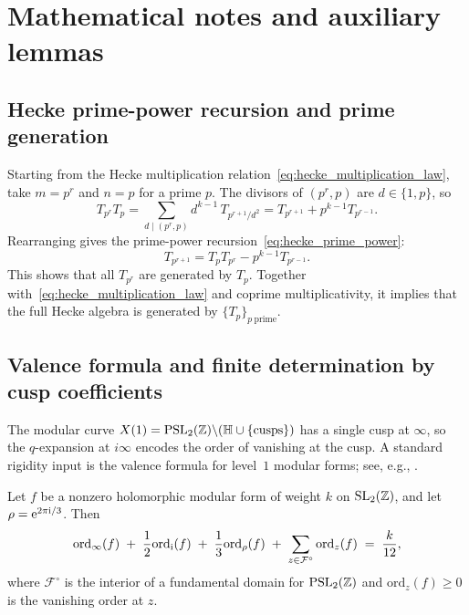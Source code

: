
\section{Mathematical notes and auxiliary lemmas}
\label{app:math_notes}

\subsection{Hecke prime-power recursion and prime generation}
\label{app:hecke_recursion}

Starting from the Hecke multiplication relation~\eqref{eq:hecke_multiplication_law}, take $m=p^r$ and $n=p$ for a prime $p$. The divisors of $(p^r,p)$ are $d\in\{1,p\}$, so
\begin{equation}
T_{p^r}T_p
=\sum_{d\mid(p^r,p)} d^{k-1}\,T_{p^{r+1}/d^2}
=T_{p^{r+1}}+p^{k-1}T_{p^{r-1}}.
\end{equation}
Rearranging gives the prime-power recursion~\eqref{eq:hecke_prime_power}:
\begin{equation}
T_{p^{r+1}}=T_pT_{p^r}-p^{k-1}T_{p^{r-1}}.
\end{equation}
This shows that all $T_{p^r}$ are generated by $T_p$. Together with~\eqref{eq:hecke_multiplication_law} and coprime multiplicativity, it implies that the full Hecke algebra is generated by $\{T_p\}_{p\ \mathrm{prime}}$.

\subsection{Valence formula and finite determination by cusp coefficients}
\label{app:valence_finite_determination}

The modular curve $X(1)=\mathrm{PSL}_2(\mathbb{Z})\backslash(\mathbb{H}\cup\{\text{cusps}\})$ has a single cusp at $\infty$, so the $q$-expansion at $i\infty$ encodes the order of vanishing at the cusp. A standard rigidity input is the valence formula for level~$1$ modular forms; see, e.g., \cite{Apostol1990,DiamondShurman2005,Serre1973}.

\begin{theorem}
\label{thm:valence_formula_level1}
Let $f$ be a nonzero holomorphic modular form of weight $k$ on $\mathrm{SL}_2(\mathbb{Z})$, and let $\rho=\mathrm{e}^{2\pi\mathrm{i}/3}$. Then
\begin{equation}
\label{eq:valence_formula_level1}
\mathrm{ord}_\infty(f)\;+\;\frac{1}{2}\mathrm{ord}_{\mathrm{i}}(f)\;+\;\frac{1}{3}\mathrm{ord}_{\rho}(f)\;+\;\sum_{z\in \mathcal{F}^\circ}\mathrm{ord}_z(f)\;=\;\frac{k}{12},
\end{equation}
where $\mathcal{F}^\circ$ is the interior of a fundamental domain for $\mathrm{PSL}_2(\mathbb{Z})$ and $\mathrm{ord}_z(f)\ge 0$ is the vanishing order at $z$.
\end{theorem}


